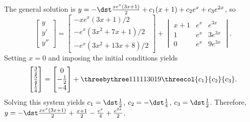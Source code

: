 \documentclass[openany]{book}
\newenvironment{sectionSolutions}{
 \begin{enumerate}[item-label={\thesection.\arabic{enumi}.}]
}{
 \end{enumerate}
}
\begin{document}
\begin{sectionSolutions}
The general solution is
$y=-\dst\frac{xe^x(3x+1)}{2}+c_1(x+1)+c_2e^x+c_3e^{2x}$, so
\[
\begin{bmatrix}y\\y'\\y''
\end{bmatrix}=
\begin{bmatrix}
-xe^x(3x+1)/2\\
-e^x(3x^2+7x+1)/2\\
-e^x(3x^2+13x+8)/2
\end{bmatrix}+
\begin{vmatrix}
x+1&e^x&e^{3x}\\1&e^x&3e^{3x}\\0&e^x&9e^{3x}
\end{vmatrix}.
\]
Setting $x=0$ and imposing the initial conditions yields
\[
\begin{bmatrix}
\frac{3}{4}\\\frac{5}{4}\\\frac{1}{4}
\end{bmatrix}=
\begin{bmatrix}
0\\-\frac{1}{2}\\-4
\end{bmatrix}
+\threebythree111113019\threecol{c_1}{c_2}{c_3}.
\]
Solving this system yields $c_1=\dst\frac{1}{2}$, $c_2=-\dst\frac{1}{4}$,
$c_3=\dst\frac{1}{2}$. Therefore,
$y=-\dst\frac{xe^x(3x+1)}{2}+\frac{x+1}{2}-\frac{e^x}{4}+\frac{e^{2x}}{2}$.





\end{sectionSolutions}
\end{document}
